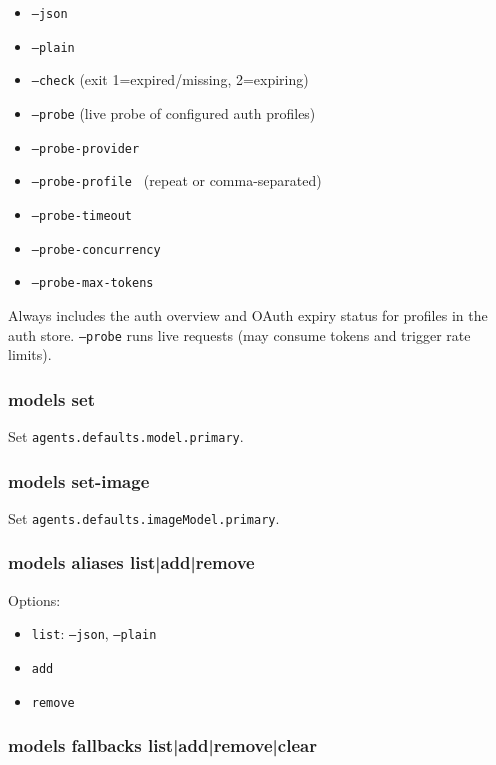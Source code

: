 \begin{itemize}
  \item \texttt{--json}
  \item \texttt{--plain}
  \item \texttt{--check} (exit 1=expired/missing, 2=expiring)
  \item \texttt{--probe} (live probe of configured auth profiles)
  \item \texttt{--probe-provider }
  \item \texttt{--probe-profile } (repeat or comma-separated)
  \item \texttt{--probe-timeout }
  \item \texttt{--probe-concurrency }
  \item \texttt{--probe-max-tokens }
\end{itemize}


Always includes the auth overview and OAuth expiry status for profiles in the auth store.
\texttt{--probe} runs live requests (may consume tokens and trigger rate limits).

\subsubsection{models set }


Set \texttt{agents.defaults.model.primary}.

\subsubsection{models set-image }


Set \texttt{agents.defaults.imageModel.primary}.

\subsubsection{models aliases list|add|remove}


Options:

\begin{itemize}
  \item \texttt{list}: \texttt{--json}, \texttt{--plain}
  \item \texttt{add  }
  \item \texttt{remove }
\end{itemize}


\subsubsection{models fallbacks list|add|remove|clear}


